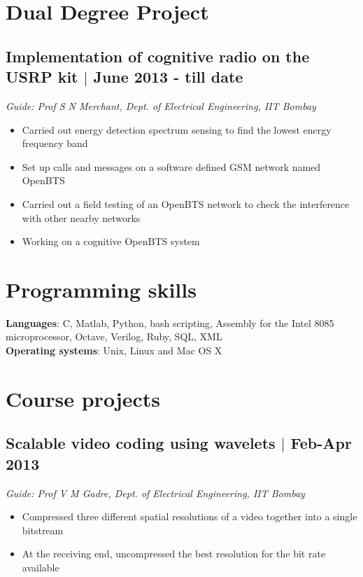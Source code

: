 \documentclass[12pt]{article}
\begin{document}
\setlength{\parindent}{0pt}
 


\vspace*{5\baselineskip}

\section*{Dual Degree Project}

\subsection*{Implementation of cognitive radio on the USRP kit $\vert$  June 2013 - till date}
\emph{Guide: Prof S N Merchant, Dept. of Electrical Engineering, IIT Bombay} 
\begin{itemize}
\item Carried out energy detection spectrum sensing to find the lowest energy frequency band   
\item Set up calls and messages on a software defined GSM network named OpenBTS 
\item Carried out a field testing of an OpenBTS network to check the interference with other nearby networks 
\item Working on a cognitive OpenBTS system 
\end{itemize}

\section*{Programming skills}
\textbf{Languages}: C, Matlab, Python, bash scripting, Assembly for the Intel 8085 microprocessor, Octave, Verilog, Ruby, SQL, XML  \\
\textbf{Operating systems}: Unix, Linux and Mac OS X


\section*{Course projects}
\subsection*{Scalable video coding using wavelets $\vert$  Feb-Apr 2013}
\emph{Guide: Prof V M Gadre, Dept. of Electrical Engineering, IIT Bombay} 
\begin{itemize} 
\item Compressed three different spatial resolutions of a video together into a single bitstream  
\item At the receiving end, uncompressed the best resolution for the bit rate available 
\end{itemize}
\end{document}

